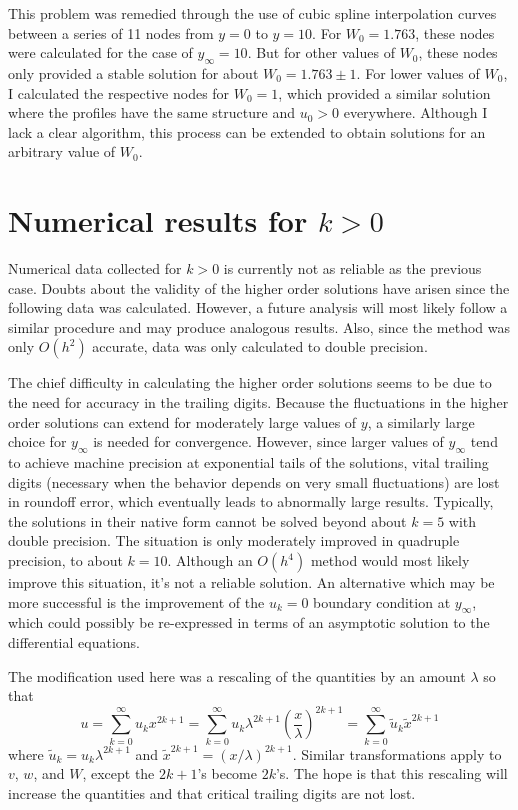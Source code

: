 \documentclass[10pt,a4paper]{report}
\begin{document}
This problem was remedied through the use of cubic spline interpolation curves between a series of 11 nodes from $y = 0$ to $y = 10$. For $W_0 = 1.763$, these nodes were calculated for the case of $y_\infty = 10$. But for other values of $W_0$, these nodes only provided a stable solution for about $W_0 = 1.763 \pm 1$. For lower values of $W_0$, I calculated the respective nodes for $W_0 = 1$, which provided a similar solution where the profiles have the same structure and $u_0 > 0$ everywhere. Although I lack a clear algorithm, this process can be extended to obtain solutions for an arbitrary value of $W_0$.

\section{Numerical results for $k>0$}

Numerical data collected for $k>0$ is currently not as reliable as the previous case. Doubts about the validity of the higher order solutions have arisen since the following data was calculated. However, a future analysis will most likely follow a similar procedure and may produce analogous results. Also, since the method was only $O(h^2)$ accurate, data was only calculated to double precision.

The chief difficulty in calculating the higher order solutions seems to be due to the need for accuracy in the trailing digits. Because the fluctuations in the higher order solutions can extend for moderately large values of $y$, a similarly large choice for $y_\infty$ is needed for convergence. However, since larger values of $y_\infty$ tend to achieve machine precision at exponential tails of the solutions, vital trailing digits (necessary when the behavior depends on very small fluctuations) are lost in roundoff error, which eventually leads to abnormally large results. Typically, the solutions in their native form cannot be solved beyond about $k=5$ with double precision. The situation is only moderately improved in quadruple precision, to about $k=10$. Although an $O(h^4)$ method would most likely improve this situation, it's not a reliable solution. An alternative which may be more successful is the improvement of the $u_k=0$ boundary condition at $y_\infty$, which could possibly be re-expressed in terms of an asymptotic solution to the differential equations.

The modification used here was a rescaling of the quantities by an amount $\lambda$ so that
\begin{equation*}
u = \sum_{k=0}^\infty u_k x^{2k+1} = \sum_{k=0}^\infty u_k \lambda^{2k+1} \left(\frac{x}{\lambda}\right)^{2k+1} = \sum_{k=0}^\infty \tilde{u}_k \tilde{x}^{2k+1}
\end{equation*}
where $\tilde{u}_k = u_k \lambda^{2k+1}$ and $\tilde{x}^{2k+1} = \left(x/\lambda\right)^{2k+1}$. Similar transformations apply to $v$, $w$, and $W$, except the $2k+1$'s become $2k$'s. The hope is that this rescaling will increase the quantities and that critical trailing digits are not lost.
\end{document}
